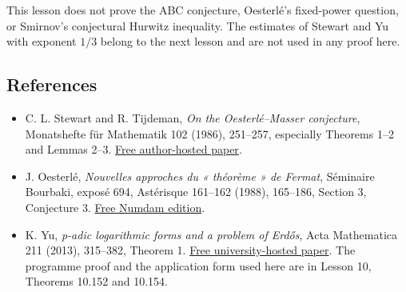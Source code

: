 \documentclass[
  11pt,
  a4paper,
]{article}
\providecommand{\tightlist}{%
  \setlength{\itemsep}{0pt}\setlength{\parskip}{0pt}}
\begin{document}
This lesson does not prove the ABC conjecture, Oesterlé's fixed-power
question, or Smirnov's conjectural Hurwitz inequality. The estimates of
Stewart and Yu with exponent \(1/3\) belong to the next lesson and are
not used in any proof here.

\subsection{References}\label{references}

\begin{itemize}
\tightlist
\item
  C. L. Stewart and R. Tijdeman, \emph{On the Oesterlé--Masser
  conjecture}, Monatshefte für Mathematik 102 (1986), 251--257,
  especially Theorems 1--2 and Lemmas 2--3.
  \href{https://uwaterloo.ca/pure-mathematics/sites/default/files/uploads/documents/log_0023.pdf}{Free
  author-hosted paper}.
\item
  J. Oesterlé, \emph{Nouvelles approches du « théorème » de Fermat},
  Séminaire Bourbaki, exposé 694, Astérisque 161--162 (1988), 165--186,
  Section 3, Conjecture 3.
  \href{https://www.numdam.org/article/SB_1987-1988__30__165_0.pdf}{Free
  Numdam edition}.
\item
  K. Yu, \emph{p-adic logarithmic forms and a problem of Erdős}, Acta
  Mathematica 211 (2013), 315--382, Theorem 1.
  \href{https://archive.ymsc.tsinghua.edu.cn/pacm_download/117/6782-11511_2013_Article_106.pdf}{Free
  university-hosted paper}. The programme proof and the application form
  used here are in Lesson 10, Theorems 10.152 and 10.154.
\end{itemize}
\end{document}
